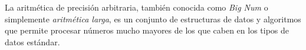 La aritmética de precisión arbitraria, también conocida como \emph{Big Num} o simplemente \emph{aritmética larga}, es un conjunto de estructuras de datos y algoritmos que permite procesar números mucho mayores de los que caben en los tipos de datos estándar. 